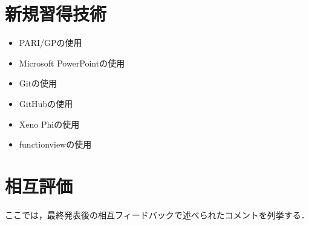 \documentclass[openany,11pt,papersize]{jsbook}
\begin{document}
\appendix
\chapter{新規習得技術}

\begin{itemize}
\item PARI/GPの使用
\item Microsoft PowerPointの使用
\item Gitの使用
\item GitHubの使用
\item Xeno Phiの使用
\item functionviewの使用
\end{itemize}


\chapter{相互評価}
ここでは，最終発表後の相互フィードバックで述べられたコメントを列挙する．
\end{document}
